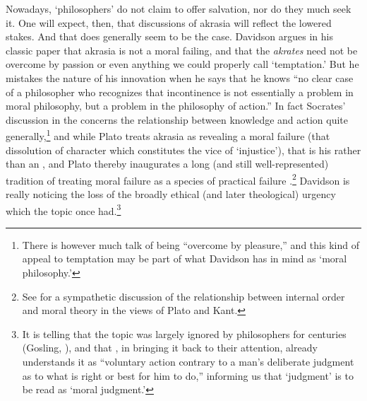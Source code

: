 \documentclass[11pt,letterpaper,oneside]{amsart}
\begin{document}
Nowadays, `philosophers' do not claim to offer salvation, nor do they much seek it. One will expect, then, that discussions of akrasia will reflect the lowered stakes. And that does generally seem to be the case. Davidson argues in his classic paper that akrasia is not a moral failing, and that the \emph{akrates} need not be overcome by passion or even anything we could properly call `temptation.' But he mistakes the nature of his innovation when he says that he knows ``no clear case of a philosopher who recognizes that incontinence is not essentially a problem in moral philosophy, but a problem in the philosophy of action.'' In fact Socrates' discussion in the  concerns the relationship between knowledge and action quite generally,\footnote{There is however much talk of being ``overcome by pleasure,'' and this kind of appeal to temptation may be part of what Davidson has in mind as `moral philosophy.'} and while Plato treats akrasia as revealing a moral failure (\ie that dissolution of character which constitutes the vice of `injustice'), that is his  rather than an , and Plato thereby inaugurates a long (and still well-represented) tradition of treating moral failure as a species of practical failure .\footnote{See \citet{korsgaard1999self} for a sympathetic discussion of the relationship between internal order and moral theory in the views of Plato and Kant.} Davidson is really noticing the loss of the broadly ethical (and later theological) urgency which the topic once had.\footnote{It is telling that the topic was largely ignored by philosophers for centuries (Gosling, \citeyear[ch.\ 7]{gosling1990weakness}), and that \citet[pp.\ 175--7]{sidgwick1893unreasonable}, in bringing it back to their attention, already understands it as ``voluntary action contrary to a man's deliberate judgment as to what is right or best for him to do,'' informing us that `judgment' is  to be read as `moral judgment.'}


\end{document}

